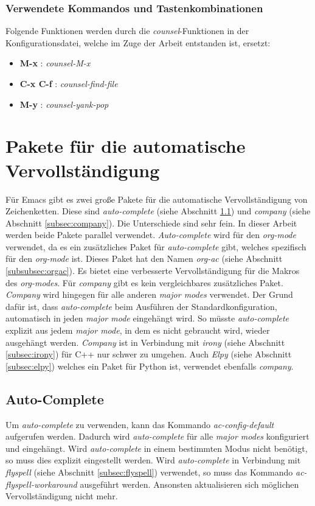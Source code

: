 \subsubsection{Verwendete Kommandos und Tastenkombinationen}
Folgende Funktionen werden durch die \textit{counsel}-Funktionen in
der Konfigurationsdatei, welche im Zuge der Arbeit entstanden ist,
ersetzt:
\begin{itemize}
\item \textbf{M-x} : \textit{counsel-M-x}
\item \textbf{C-x C-f} : \textit{counsel-find-file}
\item \textbf{M-y} : \textit{counsel-yank-pop}
\end{itemize}

\section{Pakete für die automatische Vervollständigung}
\label{sec:autocomplete}
Für Emacs gibt es zwei {\glqq}große{\grqq} Pakete für die automatische
Vervollständigung von Zeichenketten. Diese sind \textit{auto-complete}
(siehe Abschnitt \ref{subsec:ac}) und \textit{company} (siehe
Abschnitt \ref{subsec:company}). Die Unterschiede sind sehr fein. In
dieser Arbeit werden beide Pakete parallel
verwendet. \textit{Auto-complete} wird für den \textit{org-mode}
verwendet, da es ein zusätzliches Paket für \textit{auto-complete}
gibt, welches spezifisch für den \textit{org-mode} ist. Dieses Paket
hat den Namen \textit{org-ac} (siehe Abschnitt
\ref{subsubsec:orgac}). Es bietet eine verbesserte Vervollständigung
für die Makros des \textit{org-modes}. Für \textit{company} gibt es
kein vergleichbares zusätzliches Paket. \textit{Company} wird hingegen
für alle anderen \textit{major modes} verwendet. Der Grund dafür ist,
dass \textit{auto-complete} beim Ausführen der Standardkonfiguration,
automatisch in jeden \textit{major mode} eingehängt wird. So müsste
\textit{auto-complete} explizit aus jedem \textit{major mode}, in dem
es nicht gebraucht wird, wieder ausgehängt werden. \textit{Company}
ist in Verbindung mit \textit{irony} (siehe Abschnitt
\ref{subsec:irony}) für C++ nur schwer zu umgehen. Auch \textit{Elpy}
(siehe Abschnitt \ref{subsec:elpy}) welches ein Paket für Python ist,
verwendet ebenfalls \textit{company}.\\

\subsection{Auto-Complete}
\label{subsec:ac}
Um \textit{auto-complete} zu verwenden, kann das Kommando
\textit{ac-config-default} aufgerufen werden. Dadurch wird
\textit{auto-complete} für alle \textit{major modes} konfiguriert und
eingehängt. Wird \textit{auto-complete} in einem bestimmten Modus
nicht benötigt, so muss dies explizit eingestellt werden. Wird
\textit{auto-complete} in Verbindung mit \textit{flyspell} (siehe
Abschnitt \ref{subsec:flyspell}) verwendet, so muss das Kommando
\textit{ac-flyspell-workaround} ausgeführt werden. Ansonsten
aktualisieren sich möglichen Vervollständigung nicht
mehr. \cite{AutoComplete}\\


